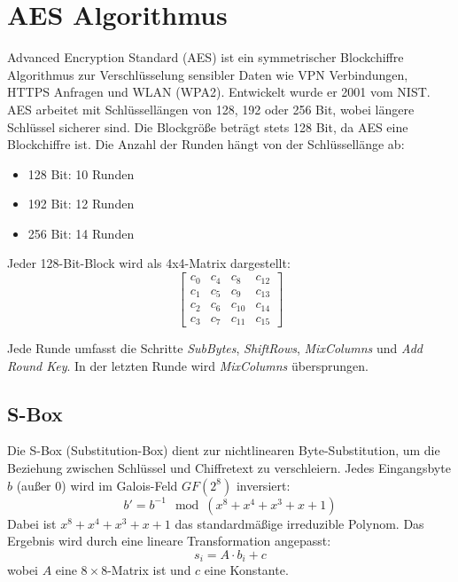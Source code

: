 \section{AES Algorithmus}
\setlength{\parindent}{0pt}

Advanced Encryption Standard (AES) ist ein symmetrischer Blockchiffre Algorithmus zur Verschlüsselung sensibler Daten wie VPN Verbindungen, HTTPS Anfragen und WLAN (WPA2). Entwickelt wurde er 2001 vom NIST. AES arbeitet mit Schlüssellängen von 128, 192 oder 256 Bit, wobei längere Schlüssel sicherer sind. Die Blockgröße beträgt stets 128 Bit, da AES eine Blockchiffre ist. Die Anzahl der Runden hängt von der Schlüssellänge ab:
\begin{itemize}
    \item 128 Bit: 10 Runden
    \item 192 Bit: 12 Runden
    \item 256 Bit: 14 Runden
\end{itemize}

Jeder 128-Bit-Block wird als 4x4-Matrix dargestellt:
\[
\begin{bmatrix}
c_0  & c_4  & c_8  & c_{12} \\
c_1  & c_5  & c_9  & c_{13} \\
c_2  & c_6  & c_{10} & c_{14} \\
c_3  & c_7  & c_{11} & c_{15}
\end{bmatrix}
\]

Jede Runde umfasst die Schritte \textit{SubBytes}, \textit{ShiftRows}, \textit{MixColumns} und \textit{Add Round Key}. In der letzten Runde wird \textit{MixColumns} übersprungen.

\subsection{S-Box}
Die S-Box (Substitution-Box) dient zur nichtlinearen Byte-Substitution, um die Beziehung zwischen Schlüssel und Chiffretext zu verschleiern. Jedes Eingangsbyte \(b\) (außer 0) wird im Galois-Feld \(GF(2^8)\) inversiert:
\[
b' = b^{-1} \mod (x^8 + x^4 + x^3 + x + 1)
\]
Dabei ist \(x^8 + x^4 + x^3 + x + 1\) das standardmäßige irreduzible Polynom. Das Ergebnis wird durch eine lineare Transformation angepasst:
\[
s_i = A \cdot b_i + c
\]
wobei \(A\) eine $8 \times 8$-Matrix ist und \(c\) eine Konstante.

